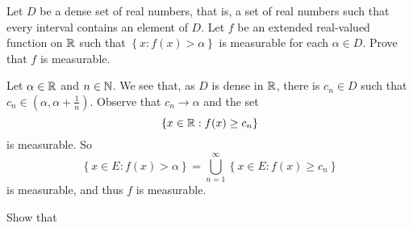 \documentclass[a4paper, answers]{exam}
\begin{document}
\begin{questions}
	\question
	Let $D$ be a dense set of real numbers, that is, a set of real numbers
	such that every interval contains an element of $D$.
	Let $f$ be an extended real-valued function on $\mathbb{R}$
	such that
	$
		\left\{
			x: f(x) > \alpha
		\right\}
	$ 
	is measurable for each $\alpha \in D$.
	Prove that $f$ is measurable.
	\begin{solution}
		Let $\alpha \in \mathbb{R}$ and $n \in \mathbb{N}$.
		We see that, as $D$ is dense in $\mathbb{R}$, there is $c_n \in D$
		such that $c_n \in \left( \alpha, \alpha + \frac1n \right)$.
		Observe that $c_n \to \alpha$ and the set
		\[
			\left\{
				x \in \mathbb{R}: f(x) \geq c_n
			\right\}
		\]
		is measurable.
		So
		\[
			\left\{
				x \in E: f(x) > \alpha
			\right\}
			= 
			\bigcup_{n=1}^\infty 
			\left\{
				x \in E: f(x) \geq c_n
			\right\}
		\]
		is measurable, and thus $f$ is measurable.
	\end{solution}

	\question
	Show that
\end{questions}
\end{document}
